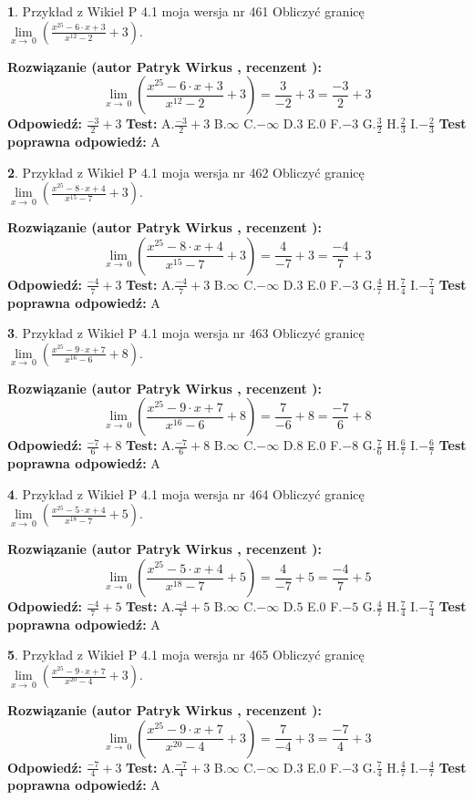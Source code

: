 \documentclass[12pt, a4paper]{article}
\theoremstyle{definition} %
\newtheorem{zad}{}
\newcommand{\zadStart}[1]{\begin{zad}#1\newline}
\newcommand{\zadStop}{\end{zad}}
\newcommand{\rozwStart}[2]{\noindent \textbf{Rozwiązanie (autor #1 , recenzent #2): }\newline}
\newcommand{\rozwStop}{\newline}
\newcommand{\odpStart}{\noindent \textbf{Odpowiedź:}\newline}
\newcommand{\odpStop}{\newline}
\newcommand{\testStart}{\noindent \textbf{Test:}\newline}
\newcommand{\testStop}{\newline}
\newcommand{\kluczStart}{\noindent \textbf{Test poprawna odpowiedź:}\newline}
\newcommand{\kluczStop}{\newline}
\begin{document}
\zadStart{Przykład z Wikieł P 4.1 moja wersja nr 461}
Obliczyć granicę $\lim\limits_{x\to\ 0}(\frac{x^{25}-6 \cdot x +3}{x^{12}-2}+3)$.
\zadStop
\rozwStart{Patryk Wirkus}{}
$$\lim\limits_{x\to\ 0}(\frac{x^{25}-6 \cdot x +3}{x^{12}-2}+3)=\frac{3}{-2}+3=\frac{-3}{2}+3$$
\rozwStop
\odpStart
$\frac{-3}{2}+3$
\odpStop
\testStart
A.$\frac{-3}{2}+3$
B.$\infty$
C.$-\infty$
D.$3$
E.$0$
F.$-3$
G.$\frac{3}{2}$
H.$\frac{2}{3}$
I.$-\frac{2}{3}$
\testStop
\kluczStart
A
\kluczStop



\zadStart{Przykład z Wikieł P 4.1 moja wersja nr 462}
Obliczyć granicę $\lim\limits_{x\to\ 0}(\frac{x^{25}-8 \cdot x +4}{x^{15}-7}+3)$.
\zadStop
\rozwStart{Patryk Wirkus}{}
$$\lim\limits_{x\to\ 0}(\frac{x^{25}-8 \cdot x +4}{x^{15}-7}+3)=\frac{4}{-7}+3=\frac{-4}{7}+3$$
\rozwStop
\odpStart
$\frac{-4}{7}+3$
\odpStop
\testStart
A.$\frac{-4}{7}+3$
B.$\infty$
C.$-\infty$
D.$3$
E.$0$
F.$-3$
G.$\frac{4}{7}$
H.$\frac{7}{4}$
I.$-\frac{7}{4}$
\testStop
\kluczStart
A
\kluczStop



\zadStart{Przykład z Wikieł P 4.1 moja wersja nr 463}
Obliczyć granicę $\lim\limits_{x\to\ 0}(\frac{x^{25}-9 \cdot x +7}{x^{16}-6}+8)$.
\zadStop
\rozwStart{Patryk Wirkus}{}
$$\lim\limits_{x\to\ 0}(\frac{x^{25}-9 \cdot x +7}{x^{16}-6}+8)=\frac{7}{-6}+8=\frac{-7}{6}+8$$
\rozwStop
\odpStart
$\frac{-7}{6}+8$
\odpStop
\testStart
A.$\frac{-7}{6}+8$
B.$\infty$
C.$-\infty$
D.$8$
E.$0$
F.$-8$
G.$\frac{7}{6}$
H.$\frac{6}{7}$
I.$-\frac{6}{7}$
\testStop
\kluczStart
A
\kluczStop



\zadStart{Przykład z Wikieł P 4.1 moja wersja nr 464}
Obliczyć granicę $\lim\limits_{x\to\ 0}(\frac{x^{25}-5 \cdot x +4}{x^{18}-7}+5)$.
\zadStop
\rozwStart{Patryk Wirkus}{}
$$\lim\limits_{x\to\ 0}(\frac{x^{25}-5 \cdot x +4}{x^{18}-7}+5)=\frac{4}{-7}+5=\frac{-4}{7}+5$$
\rozwStop
\odpStart
$\frac{-4}{7}+5$
\odpStop
\testStart
A.$\frac{-4}{7}+5$
B.$\infty$
C.$-\infty$
D.$5$
E.$0$
F.$-5$
G.$\frac{4}{7}$
H.$\frac{7}{4}$
I.$-\frac{7}{4}$
\testStop
\kluczStart
A
\kluczStop



\zadStart{Przykład z Wikieł P 4.1 moja wersja nr 465}
Obliczyć granicę $\lim\limits_{x\to\ 0}(\frac{x^{25}-9 \cdot x +7}{x^{20}-4}+3)$.
\zadStop
\rozwStart{Patryk Wirkus}{}
$$\lim\limits_{x\to\ 0}(\frac{x^{25}-9 \cdot x +7}{x^{20}-4}+3)=\frac{7}{-4}+3=\frac{-7}{4}+3$$
\rozwStop
\odpStart
$\frac{-7}{4}+3$
\odpStop
\testStart
A.$\frac{-7}{4}+3$
B.$\infty$
C.$-\infty$
D.$3$
E.$0$
F.$-3$
G.$\frac{7}{4}$
H.$\frac{4}{7}$
I.$-\frac{4}{7}$
\testStop
\kluczStart
A
\kluczStop
\end{document}
